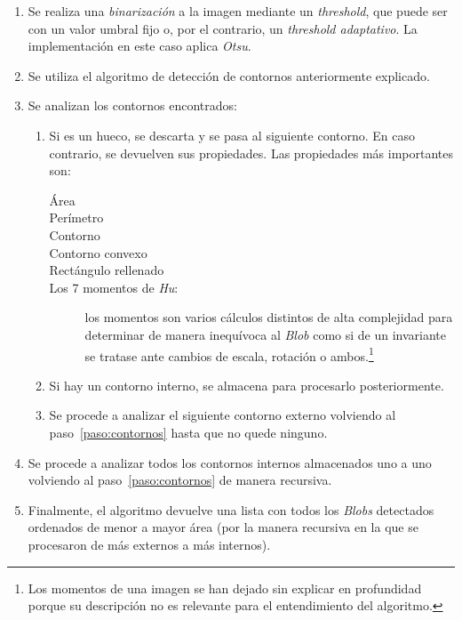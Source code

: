 \begin{enumerate}
\item Se realiza una \emph{binarización} a la imagen mediante un
  \emph{threshold}, que puede ser con un valor umbral fijo o, por el
  contrario, un \emph{threshold adaptativo}. La implementación en este
  caso aplica \emph{Otsu}.
\item Se utiliza el algoritmo de detección de contornos anteriormente
  explicado.
\item Se analizan los contornos encontrados:
  \begin{enumerate}[label*=\arabic*.]
  \item\label{paso:contornos} Si es un hueco, se descarta y se pasa al
    siguiente contorno. En caso contrario, se devuelven sus
    propiedades. Las propiedades más importantes son:
    \begin{description}
    \item[Área]
    \item[Perímetro]
    \item[Contorno]
    \item[Contorno convexo]
    \item[Rectángulo rellenado]
    \item[Los 7 momentos de \emph{Hu}:] los momentos
      \emph{\citep*[Visual pattern recognition by moment
        invariants]{hu1962visual}} son varios cálculos distintos de
      alta complejidad para determinar de manera inequívoca al
      \emph{Blob} como si de un invariante se tratase ante cambios de
      escala, rotación o ambos.\footnote{Los momentos de una imagen se
        han dejado sin explicar en profundidad porque su descripción
        no es relevante para el entendimiento del algoritmo.}
    \end{description}
  \item Si hay un contorno interno, se almacena para procesarlo
    posteriormente.
  \item Se procede a analizar el siguiente contorno externo volviendo
    al paso~\ref{paso:contornos} hasta que no quede ninguno.
  \end{enumerate}
\item Se procede a analizar todos los contornos internos almacenados
  uno a uno volviendo al paso~\ref{paso:contornos} de manera
  recursiva.
\item Finalmente, el algoritmo devuelve una lista con todos los
  \emph{Blobs} detectados ordenados de menor a mayor área (por la
  manera recursiva en la que se procesaron de más externos a más
  internos).
\end{enumerate}

